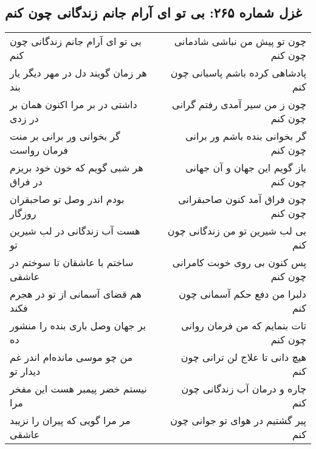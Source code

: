 \begin{center}
\section*{غزل شماره ۲۶۵: بی تو ای آرام جانم زندگانی چون کنم}
\label{sec:265}
\begin{longtable}{l p{0.5cm} r}
بی تو ای آرام جانم زندگانی چون کنم
&&
چون تو پیش من نباشی شادمانی چون کنم
\\
هر زمان گویند دل در مهر دیگر یار بند
&&
پادشاهی کرده باشم پاسبانی چون کنم
\\
داشتی در بر مرا اکنون همان بر در زدی
&&
چون ز من سیر آمدی رفتم گرانی چون کنم
\\
گر بخوانی ور برانی بر منت فرمان رواست
&&
گر بخوانی بنده باشم ور برانی چون کنم
\\
هر شبی گویم که خون خود بریزم در فراق
&&
باز گویم این جهان و آن جهانی چون کنم
\\
بودم اندر وصل تو صاحبقران روزگار
&&
چون فراق آمد کنون صاحبقرانی چون کنم
\\
هست آب زندگانی در لب شیرین تو
&&
بی لب شیرین تو من زندگانی چون کنم
\\
ساختم با عاشقان تا سوختم در عاشقی
&&
پس کنون بی روی خوبت کامرانی چون کنم
\\
هم قضای آسمانی از تو در هجرم فکند
&&
دلبرا من دفع حکم آسمانی چون کنم
\\
بر جهان وصل باری بنده را منشور ده
&&
تات بنمایم که من فرمان روانی چون کنم
\\
من چو موسی مانده‌ام اندر غم دیدار تو
&&
هیچ دانی تا علاج لن ترانی چون کنم
\\
نیستم خضر پیمبر هست این مفخر مرا
&&
چاره و درمان آب زندگانی چون کنم
\\
مر مرا گویی که پیران را نزیبد عاشقی
&&
پیر گشتیم در هوای تو جوانی چون کنم
\\
\end{longtable}
\end{center}
